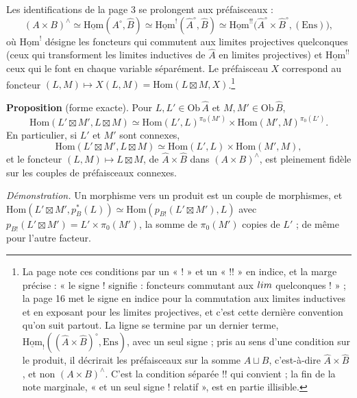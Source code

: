 \documentclass[11pt,a4paper]{article}
\begin{document}
Les identifications de la page 3 se prolongent aux préfaisceaux :
\[
(A \times B)^{\wedge} \simeq \underline{\mathrm{Hom}}(A^{\circ}, \widehat{B})
\simeq \underline{\mathrm{Hom}}^{!}(\widehat{A}^{\circ}, \widehat{B})
\simeq \underline{\mathrm{Hom}}^{!!}\bigl(\widehat{A}^{\circ} \times
\widehat{B}^{\circ}, (\mathrm{Ens})\bigr),
\]
où $\underline{\mathrm{Hom}}^{!}$ désigne les foncteurs qui commutent aux
limites projectives quelconques (ceux qui transforment les limites
inductives de $\widehat{A}$ en limites projectives) et
$\underline{\mathrm{Hom}}^{!!}$ ceux qui le font en chaque variable
séparément. Le préfaisceau $X$ correspond au foncteur $(L, M) \mapsto X(L, M)
= \mathrm{Hom}(L \boxtimes M, X)$.\footnote{La page note ces conditions par
un « ! » et un « !! » en indice, et la marge précise : « le signe ! signifie :
foncteurs commutant aux $\varprojlim$ quelconques ! » ; la page 16 met le
signe en indice pour la commutation aux limites inductives et en exposant
pour les limites projectives, et c'est cette dernière convention qu'on suit
partout. La ligne se termine par un dernier terme,
$\underline{\mathrm{Hom}}_{!}((\widehat{A} \times \widehat{B})^{\circ},
\mathrm{Ens})$, avec un seul signe ; pris au sens d'une condition sur le
produit, il décrirait les préfaisceaux sur la somme $A \sqcup B$,
c'est-à-dire $\widehat{A} \times \widehat{B}$, et non $(A \times
B)^{\wedge}$. C'est la condition séparée !! qui convient ; la fin de la note
marginale, « et un seul signe ! relatif », est en partie illisible.}

\textbf{Proposition} (forme exacte). Pour $L, L' \in \mathrm{Ob}\,
\widehat{A}$ et $M, M' \in \mathrm{Ob}\, \widehat{B}$,
\[
\mathrm{Hom}(L' \boxtimes M', L \boxtimes M) \simeq
\mathrm{Hom}(L', L)^{\pi_{0}(M')} \times \mathrm{Hom}(M', M)^{\pi_{0}(L')}.
\]
En particulier, si $L'$ et $M'$ sont connexes,
\[
\mathrm{Hom}(L' \boxtimes M', L \boxtimes M) \simeq \mathrm{Hom}(L', L)
\times \mathrm{Hom}(M', M),
\]
et le foncteur $(L, M) \mapsto L \boxtimes M$, de $\widehat{A} \times
\widehat{B}$ dans $(A \times B)^{\wedge}$, est pleinement fidèle sur les
couples de préfaisceaux connexes.

\emph{Démonstration.} Un morphisme vers un produit est un couple de
morphismes, et $\mathrm{Hom}(L' \boxtimes M', p_{B}^{*}(L)) \simeq
\mathrm{Hom}(p_{B!}(L' \boxtimes M'), L)$ avec $p_{B!}(L' \boxtimes M') = L'
\times \pi_{0}(M')$, la somme de $\pi_{0}(M')$ copies de $L'$ ; de même pour
l'autre facteur.
\end{document}
